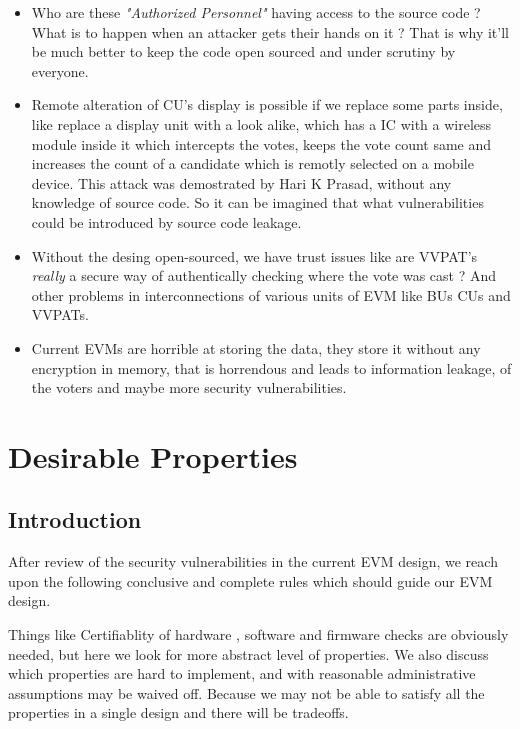 \documentclass[12pt]{report}
\begin{document}
\begin{itemize}
  \label{sec:surv}
  \item Who are these \textit{"Authorized Personnel"} having access to the source code ? What is to happen when an attacker gets their hands on it ? That is why it'll be much better to keep the code open sourced and under scrutiny by everyone. 

  \item Remote alteration of CU's display is possible if we replace some parts inside, like replace a display unit with a look alike, which has a IC with a wireless module inside it which intercepts the votes, keeps the vote count same and increases the count of a candidate which is remotly selected on a mobile device.
  This attack was demostrated by Hari K Prasad, without any knowledge of source code. So it can be imagined that what vulnerabilities could be introduced by source code leakage.

  \item Without the desing open-sourced, we have trust issues like are VVPAT's \textit{really} a secure way of authentically checking where the vote was cast ? And other problems in interconnections of various units of EVM like BUs CUs and VVPATs. 

  \item Current EVMs are horrible at storing the data, they store it without any encryption in memory, that is horrendous and leads to information leakage, of the voters and maybe more security vulnerabilities.
\end{itemize}


\chapter{Desirable Properties}
\section{Introduction}
After review of the security vulnerabilities in the current EVM design, we reach upon the following conclusive and complete rules which should guide our EVM design.

Things like Certifiablity of hardware , software and firmware checks are obviously needed, but here we look for more abstract level of properties.
We also discuss which properties are hard to implement, and with reasonable administrative assumptions may be waived off. Because we may not be able to satisfy all the properties in a single design and there will be tradeoffs.
\end{document}
